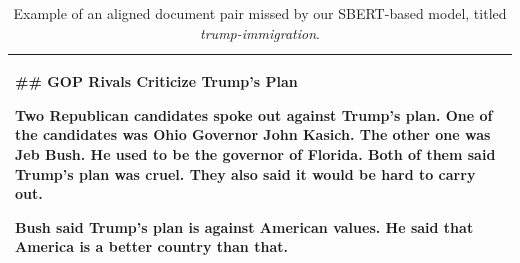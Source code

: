 \begin{table}
\begin{center}
\begin{tabular}{|L{14.7cm}|}
\#\# GOP Rivals Criticize Trump's Plan

Two Republican candidates spoke out against Trump's plan. One of the candidates was Ohio Governor John Kasich. The other one was Jeb Bush. He used to be the governor of Florida. Both of them said Trump's plan was cruel. They also said it would be hard to carry out.

Bush said Trump's plan is against American values. He said that America is a better country than that. \\ \hline
\end{tabular}
\end{center}
\caption{\label{table:example3} Example of an aligned document pair missed by our SBERT-based model, titled \textit{trump-immigration}.}
\end{table}
